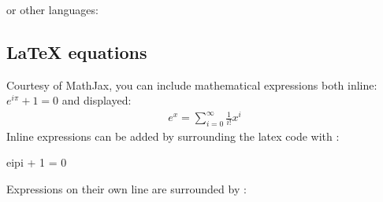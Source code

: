 \documentclass[letterpaper,10pt,english]{sphinxmanual}
\begin{document}
or other languages:

\begin{sphinxVerbatim}[commandchars=\\\{\}]
    
   
    
\end{sphinxVerbatim}


\subsection{LaTeX equations}
\label{\detokenize{notebooks/Intro/EditCells:LaTeX-equations}}
Courtesy of MathJax, you can include mathematical expressions both inline: \(e^{i\pi} + 1 = 0\) and displayed:
\begin{equation*}
\begin{split}e^x=\sum_{i=0}^\infty \frac{1}{i!}x^i\end{split}
\end{equation*}
Inline expressions can be added by surrounding the latex code with \sphinxcode{\sphinxupquote{\$}}:

\begin{sphinxVerbatim}[commandchars=\\\{\}]
\PYGZdl{}e\PYGZca{}\PYGZob{}i\PYGZbs{}pi\PYGZcb{} + 1 = 0\PYGZdl{}
\end{sphinxVerbatim}

Expressions on their own line are surrounded by \sphinxcode{\sphinxupquote{\$\$}}:

\begin{sphinxVerbatim}[commandchars=\\\{\}]
\end{sphinxVerbatim}
\end{document}
